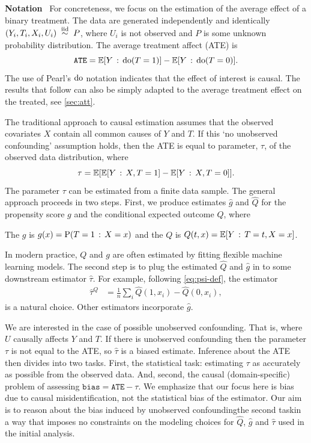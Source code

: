 \documentclass{article}
\DeclareRobustCommand{\parhead}[1]{\textbf{#1}~}
\begin{document}
\parhead{Notation}
For concreteness, we focus on the estimation of the average effect of a binary treatment.
The data are generated independently and identically $(Y_{i},T_{i},X_{i},U_{i}) \overset{\mathrm{iid}}{\ \sim\ } P$,
where $U_{i}$ is not observed and $P$ is some unknown probability distribution.
The average treatment affect (ATE) is 
\[
\mathtt{ATE}=\EE[Y\given\cdo(T=1)]-\EE[Y\given\cdo(T=0)].
\]
The use of Pearl's $\mathrm{do}$ notation indicates that the effect of interest
is causal.
The results that follow can also be simply adapted to the average treatment effect on the treated, see \cref{sec:att}.
%
%
%

The traditional approach to causal estimation assumes that the observed
covariates $X$ contain all common causes of $Y$ and $T$.
If this `no unobserved confounding' assumption holds, then the ATE is equal
to parameter, $\tau$, of the observed data distribution, where
\begin{equation}
\tau=\EE[\EE[Y\given X,T=1]-\EE[Y\given X,T=0]].\label{eq:psi-def}
\end{equation}
The parameter $\tau$ can be estimated from a finite data sample.
The general approach proceeds in two steps. First, we produce estimates
$\hat{g}$ and $\hat{Q}$ for the propensity score $g$ and the conditional
expected outcome $Q$, where
\begin{defn}
The  $g$ is $g(x)=\Pr(T=1\given X=x)$
and the  $Q$ is $Q(t,x)=\EE[Y\given T=t,X=x]$.
\end{defn}
In modern practice, $Q$ and $g$ are often estimated by fitting flexible
machine learning models. The second step is to plug the estimated
$\hat{Q}$ and $\hat{g}$ in to some downstream estimator $\hat{\tau}$.
For example,
following \ref{eq:psi-def}, the estimator
\begin{align*}
\hat{\tau}^{Q} & =\frac{1}{n}\sum_{i}\hat{Q}(1,x_{i})-\hat{Q}(0,x_{i}),
\end{align*}
is a natural choice. Other estimators incorporate $\hat{g}$.
%
%
%
%
%
%

We are interested in the case of possible unobserved confounding.
That is, where $U$ causally affects $Y$ and $T$. If there is unobserved
confounding then the parameter $\tau$ is not equal to the ATE, so
$\hat{\tau}$ is a biased estimate. Inference about the ATE then divides
into two tasks. First, the statistical task: estimating $\tau$ as
accurately as possible from the observed data. And, second, the causal
(domain-specific) problem of assessing $\mathtt{bias}=\mathtt{ATE}-\tau$.
We emphasize that our focus here is bias due to causal misidentification,
not the statistical bias of the estimator.
Our aim is to reason about the bias induced by unobserved confounding\textemdash the
second task\textemdash in a way that imposes no constraints on
the modeling choices for $\hat{Q}$, $\hat{g}$ and $\hat{\tau}$
used in the initial analysis.
\end{document}
